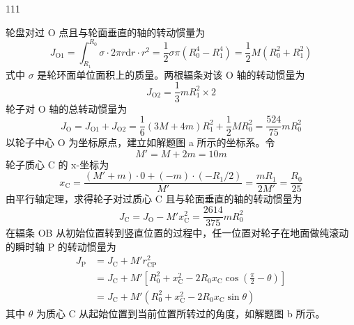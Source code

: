 \begin{solution}{111}
    \begin{subsolution}
        轮盘对过 O 点且与轮面垂直的轴的转动惯量为
        \begin{equation}
            J_{\mathrm{O}1} = \int_{R_{1}}^{R_{0}} \sigma \cdot 2\pi r \mathrm{d}r \cdot r^{2} = \frac{1}{2} \sigma \pi \left(R_{0}^{4} - R_{1}^{4}\right) = \frac{1}{2} M \left(R_{0}^{2} + R_{1}^{2}\right)
            \label{eq:1.s111}
        \end{equation}
        式中 $\sigma$ 是轮环面单位面积上的质量。两根辐条对该 O 轴的转动惯量为
        \begin{equation}
            J_{\mathrm{O}2} = \frac{1}{3} m R_{1}^{2} \times 2
            \label{eq:2.s111}
        \end{equation}
        轮子对 O 轴的总转动惯量为
        \begin{equation}
            J_{\mathrm{O}} = J_{\mathrm{O}1} + J_{\mathrm{O}2} = \frac{1}{6} (3 M + 4 m) R_{1}^{2} + \frac{1}{2} M R_{0}^{2} = \frac{524}{75} m R_{0}^{2}
            \label{eq:3.s111}
        \end{equation}
        以轮子中心 O 为坐标原点，建立如解题图 a 所示的坐标系。令
        \begin{equation}
            M' = M + 2m = 10m
        \end{equation}
        轮子质心 C 的 x-坐标为
        \begin{equation}
            x_{\mathrm{C}} = \frac{(M' + m) \cdot 0 + (-m) \cdot (-R_{1}/2)}{M'} = \frac{m R_{1}}{2 M'} = \frac{R_{0}}{25}
            \label{eq:4.s111}
        \end{equation}
        由平行轴定理，求得轮子对过质心 C 且与轮面垂直的轴的转动惯量为
        \begin{equation}
            J_{\mathrm{C}} = J_{\mathrm{O}} - M' x_{\mathrm{C}}^{2} = \frac{2614}{375} m R_{0}^{2}
            \label{eq:5.s111}
        \end{equation}
        在辐条 OB 从初始位置转到竖直位置的过程中，任一位置对轮子在地面做纯滚动的瞬时轴 P 的转动惯量为
        \begin{equation}
            \begin{aligned}
                J_{\mathrm{P}} &= J_{\mathrm{C}} + M' r_{\mathrm{CP}}^{2} \\
                &= J_{\mathrm{C}} + M' \left[ R_{0}^{2} + x_{\mathrm{C}}^{2} - 2 R_{0} x_{\mathrm{C}} \cos\left(\frac{\pi}{2} - \theta\right) \right] \\
                &= J_{\mathrm{C}} + M' \left(R_{0}^{2} + x_{\mathrm{C}}^{2} - 2 R_{0} x_{\mathrm{C}} \sin\theta\right)
            \end{aligned}
            \label{eq:6.s111}
        \end{equation}
        其中 $\theta$ 为质心 C 从起始位置到当前位置所转过的角度，如解题图 b 所示。


\end{subsolution}
\end{solution}
